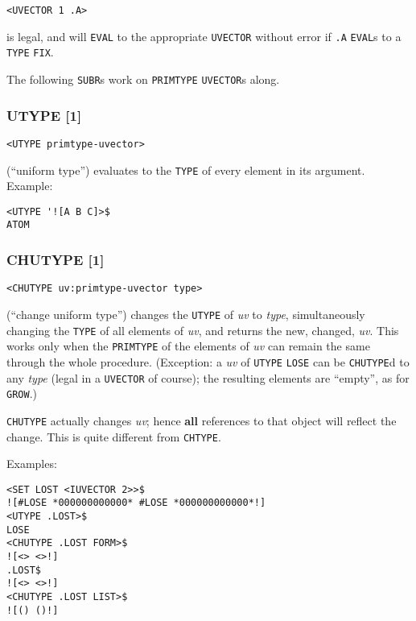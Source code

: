 \documentclass[a4paper]{scrbook}
\begin{document}
\begin{verbatim}
<UVECTOR 1 .A>
\end{verbatim}

is legal, and will \texttt{EVAL} to the appropriate \texttt{UVECTOR} without error if \texttt{.A} \texttt{EVAL}s to a
\texttt{TYPE} \texttt{FIX}.

The following \texttt{SUBR}s work on \texttt{PRIMTYPE} \texttt{UVECTOR}s along.

\subsubsection{UTYPE {[}1{]}}\label{utype-1}

\begin{verbatim}
<UTYPE primtype-uvector>
\end{verbatim}

 (``uniform type'') evaluates to the \texttt{TYPE} of every element in its argument. Example:

\begin{verbatim}
<UTYPE '![A B C]>$
ATOM
\end{verbatim}

\subsubsection{CHUTYPE {[}1{]}}\label{chutype-1}

\begin{verbatim}
<CHUTYPE uv:primtype-uvector type>
\end{verbatim}

 (``change uniform type'') changes the \texttt{UTYPE} of \emph{uv} to \emph{type},
simultaneously changing the \texttt{TYPE} of all elements of \emph{uv}, and returns the new, changed, \emph{uv}. This works
only when the \texttt{PRIMTYPE} of the elements of \emph{uv} can remain the same through the whole procedure. (Exception: a
\emph{uv} of \texttt{UTYPE} \texttt{LOSE} can be \texttt{CHUTYPE}d to any \emph{type} (legal in a
\texttt{UVECTOR} of course); the resulting elements are ``empty'', as for \texttt{GROW}.)

\texttt{CHUTYPE} actually changes \emph{uv}; hence \textbf{all} references to that object will reflect the change. This is
quite different from \texttt{CHTYPE}.

Examples:

\begin{verbatim}
<SET LOST <IUVECTOR 2>>$
![#LOSE *000000000000* #LOSE *000000000000*!]
<UTYPE .LOST>$
LOSE
<CHUTYPE .LOST FORM>$
![<> <>!]
.LOST$
![<> <>!]
<CHUTYPE .LOST LIST>$
![() ()!]
\end{verbatim}
\end{document}
